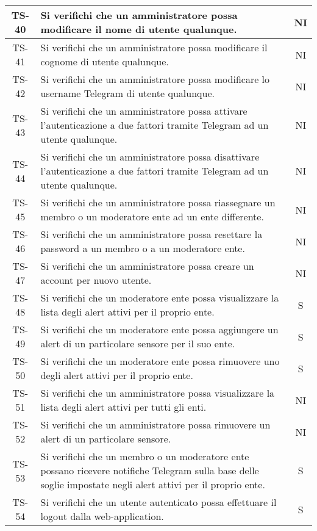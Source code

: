\begin{center}
\begin{longtable}{|c|p{10cm}|c|}
			 \hline
			 TS-40 & Si verifichi che un amministratore possa modificare il nome di utente qualunque. & NI \\
			 \hline
			 TS-41 & Si verifichi che un amministratore possa modificare il cognome di utente qualunque. & NI \\
			 \hline
			 TS-42 & Si verifichi che un amministratore possa modificare lo username Telegram di utente qualunque. & NI \\
			 \hline
			 TS-43 & Si verifichi che un amministratore possa attivare l'autenticazione a due fattori tramite Telegram ad un utente qualunque. & NI \\
			 \hline
			 TS-44 & Si verifichi che un amministratore possa disattivare l'autenticazione a due fattori tramite Telegram ad un utente qualunque. & NI \\
			 \hline
			 TS-45 & Si verifichi che un amministratore possa riassegnare un membro o un moderatore ente ad un ente differente. & NI \\
			 \hline
			 TS-46 & Si verifichi che un amministratore possa resettare la password a un membro o a un moderatore ente. & NI \\
			 \hline
			 TS-47 & Si verifichi che un amministratore possa creare un account per nuovo utente. & NI \\
			 \hline
			 TS-48 & Si verifichi che un moderatore ente possa visualizzare la lista degli alert attivi per il proprio ente. & S \\
			 \hline
			 TS-49 & Si verifichi che un moderatore ente possa aggiungere un alert di un particolare sensore per il suo ente. & S \\
			 \hline
			 TS-50 & Si verifichi che un moderatore ente possa rimuovere uno degli alert attivi per il proprio ente. & S \\
			 \hline
			 TS-51 & Si verifichi che un amministratore possa visualizzare la lista degli alert attivi per tutti gli enti. & NI \\
			 \hline
			 TS-52 & Si verifichi che un amministratore possa rimuovere un alert di un particolare sensore. & NI \\
			 \hline
			 TS-53 & Si verifichi che un membro o un moderatore ente possano ricevere notifiche Telegram sulla base delle soglie impostate negli alert attivi per il proprio ente. & S \\
			 \hline
			 TS-54 & Si verifichi che un utente autenticato possa effettuare il logout dalla web-application. & S \\
			 \hline

\end{longtable}
\end{center}
